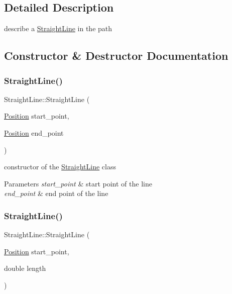 \subsection{Detailed Description}
describe a \mbox{\hyperlink{class_straight_line}{Straight\+Line}} in the path 

\subsection{Constructor \& Destructor Documentation}
\mbox{\label{class_straight_line_a583064766a4c73bfa58ee1cb9f5b4495}} 
\subsubsection{\texorpdfstring{Straight\+Line()}{StraightLine()}\hspace{0.1cm}{\footnotesize\ttfamily [1/2]}}
{\footnotesize\ttfamily Straight\+Line\+::\+Straight\+Line (\begin{DoxyParamCaption}\item[{\mbox{\hyperlink{class_position}{Position}}}]{start\+\_\+point,  }\item[{\mbox{\hyperlink{class_position}{Position}}}]{end\+\_\+point }\end{DoxyParamCaption})}



constructor of the \mbox{\hyperlink{class_straight_line}{Straight\+Line}} class 


\begin{DoxyParams}{Parameters}
{\em start\+\_\+point} & start point of the line \\
\hline
{\em end\+\_\+point} & end point of the line \\
\hline
\end{DoxyParams}
\mbox{\label{class_straight_line_ac55a20f7c9d8ba62f4dd0bba0e9d8c4e}} 
\subsubsection{\texorpdfstring{Straight\+Line()}{StraightLine()}\hspace{0.1cm}{\footnotesize\ttfamily [2/2]}}
{\footnotesize\ttfamily Straight\+Line\+::\+Straight\+Line (\begin{DoxyParamCaption}\item[{\mbox{\hyperlink{class_position}{Position}}}]{start\+\_\+point,  }\item[{double}]{length }\end{DoxyParamCaption})}



